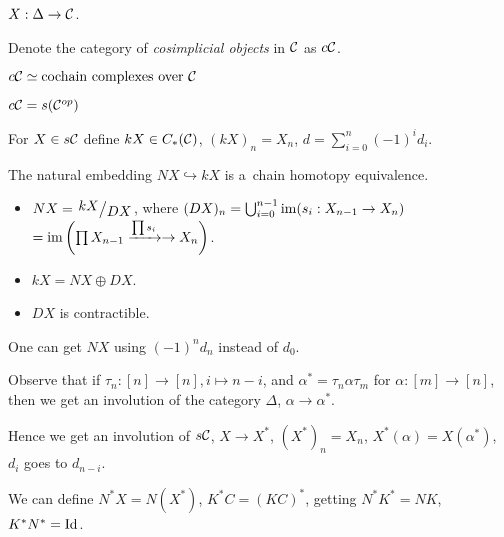 



    \begin{definition}
        $X:\Delta \to \mathcal{C}$.
        
        Denote the category of {\em cosimplicial objects} in $\mathcal{C}$ as $c\mathcal{C}$.
    \end{definition}
    
    \begin{theorem}
        $c\mathcal{C} \simeq \text{cochain complexes over }\mathcal{C}$
    \end{theorem}
    
    \begin{remark}
        $c\mathcal{C} = s(\mathcal{C}^{op})$
    \end{remark}
    
    \begin{definition}
        For $X \in s\mathcal{C}$ define $kX \in C_\ast(\mathcal{C})$,
        $(kX)_n = X_n$, $d=\sum_{i=0}^n (-1)^i d_i$.
    \end{definition}
    
    \begin{theorem}
        The natural embedding $NX \hookrightarrow kX$
        is a~chain homotopy equivalence.
    \end{theorem}
    
    \begin{remark}
        \begin{itemize}
            \item $NX = \bigslant{kX}{DX}$, where 
            $(DX)_n = \bigcup_{i=0}^{n-1} 
            {\mathrm{im}}(s_i:X_{n-1} \to X_n)$\\
            $= {\mathrm{im}}\left(\prod X_{n-1} \xrightarrow{\prod s_i} \to X_n\right)$.
            \item $kX = NX \oplus DX$.
            \item $DX$ is contractible.
        \end{itemize}
    \end{remark}
    
    \begin{remark}
        One can get $NX$  using $(-1)^n d_n$ instead of $d_0$.
    \end{remark}
    
    \begin{remark}
        Observe that if $\tau_n:[n]\to[n], i \mapsto n-i$,
        and $\alpha^\ast = \tau_n \alpha \tau_m$ for
        $\alpha:[m]\to[n]$, then we get an involution of the category $\Delta$,
        $\alpha \to \alpha^\ast$.
        
        Hence we get an involution of $s\mathcal{C}$,
        $X \to X^\ast$, $(X^\ast)_n = X_n$, $X^\ast(\alpha) = X(\alpha^\ast)$,
        $d_i$ goes to $d_{n-i}$.
        
        We can define $N^\ast X = N(X^\ast)$, $K^\ast C = (KC)^\ast$,
        getting $N^\ast K^\ast = NK$, $K^\ast N^\ast = {\mathrm{Id}}$.
    \end{remark}
    
